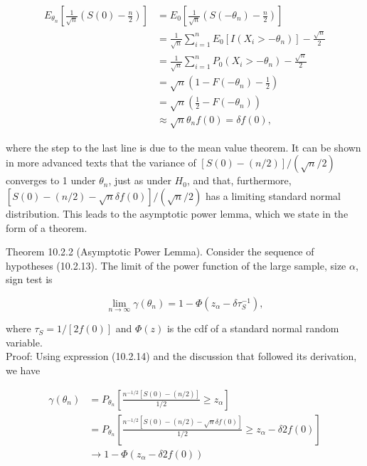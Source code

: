 \begin{align*}
E_{\theta_{n}}\left[\frac{1}{\sqrt{n}}\left(S(0)-\frac{n}{2}\right)\right] & =E_{0}\left[\frac{1}{\sqrt{n}}\left(S\left(-\theta_{n}\right)-\frac{n}{2}\right)\right] \\
& =\frac{1}{\sqrt{n}} \sum_{i=1}^{n} E_{0}\left[I\left(X_{i}>-\theta_{n}\right)\right]-\frac{\sqrt{n}}{2} \\
& =\frac{1}{\sqrt{n}} \sum_{i=1}^{n} P_{0}\left(X_{i}>-\theta_{n}\right)-\frac{\sqrt{n}}{2} \\
& =\sqrt{n}\left(1-F\left(-\theta_{n}\right)-\frac{1}{2}\right) \\
& =\sqrt{n}\left(\frac{1}{2}-F\left(-\theta_{n}\right)\right) \\
& \approx \sqrt{n} \theta_{n} f(0)=\delta f(0), \tag{10.2.14}
\end{align*}


where the step to the last line is due to the mean value theorem. It can be shown in more advanced texts that the variance of $[S(0)-(n / 2)] /(\sqrt{n} / 2)$ converges to 1 under $\theta_{n}$, just as under $H_{0}$, and that, furthermore, $[S(0)-(n / 2)-\sqrt{n} \delta f(0)] /(\sqrt{n} / 2)$ has a limiting standard normal distribution. This leads to the asymptotic power lemma, which we state in the form of a theorem.

Theorem 10.2.2 (Asymptotic Power Lemma). Consider the sequence of hypotheses (10.2.13). The limit of the power function of the large sample, size $\alpha$, sign test is


\begin{equation*}
\lim _{n \rightarrow \infty} \gamma\left(\theta_{n}\right)=1-\Phi\left(z_{\alpha}-\delta \tau_{S}^{-1}\right), \tag{10.2.15}
\end{equation*}


where $\tau_{S}=1 /[2 f(0)]$ and $\Phi(z)$ is the cdf of a standard normal random variable.\\
Proof: Using expression (10.2.14) and the discussion that followed its derivation, we have

$$
\begin{aligned}
\gamma\left(\theta_{n}\right) & =P_{\theta_{n}}\left[\frac{n^{-1 / 2}[S(0)-(n / 2)]}{1 / 2} \geq z_{\alpha}\right] \\
& =P_{\theta_{n}}\left[\frac{n^{-1 / 2}[S(0)-(n / 2)-\sqrt{n} \delta f(0)]}{1 / 2} \geq z_{\alpha}-\delta 2 f(0)\right] \\
& \rightarrow 1-\Phi\left(z_{\alpha}-\delta 2 f(0)\right)
\end{aligned}
$$

